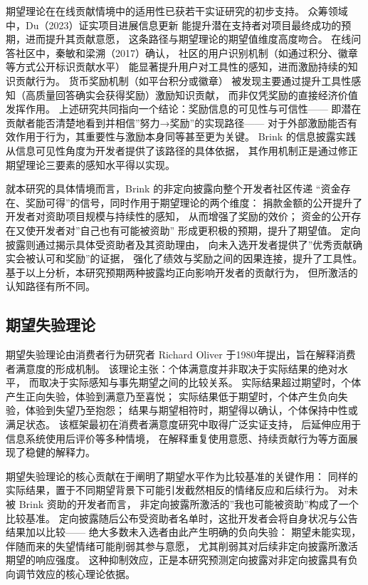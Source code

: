 期望理论在在线贡献情境中的适用性已获若干实证研究的初步支持。
众筹领域中，Du（2023）证实项目进展信息更新
能提升潜在支持者对项目最终成功的预期，进而提升其贡献意愿，
这条路径与期望理论的期望值维度高度吻合\cite{du2023impact}。
在线问答社区中，秦敏和梁溯（2017）确认，
社区的用户识别机制（如通过积分、徽章等方式公开标识贡献水平）
能显著提升用户对工具性的感知，进而激励持续的知识贡献行为\cite{qin2017user}。
货币奖励机制（如平台积分或徽章）
被发现主要通过提升工具性感知（高质量回答确实会获得奖励）激励知识贡献，
而非仅凭奖励的直接经济价值发挥作用。
上述研究共同指向一个结论：奖励信息的可见性与可信性——
即潜在贡献者能否清楚地看到并相信”努力→奖励”的实现路径——
对于外部激励能否有效作用于行为，其重要性与激励本身同等甚至更为关键。
Brink 的信息披露实践从信息可见性角度为开发者提供了该路径的具体依据，
其作用机制正是通过修正期望理论三要素的感知水平得以实现。

就本研究的具体情境而言，Brink 的非定向披露向整个开发者社区传递
“资金存在、奖励可得”的信号，同时作用于期望理论的两个维度：
捐款金额的公开提升了开发者对资助项目规模与持续性的感知，
从而增强了奖励的效价；
资金的公开存在又使开发者对”自己也有可能被资助”
形成更积极的预期，提升了期望值。
定向披露则通过揭示具体受资助者及其资助理由，
向未入选开发者提供了”优秀贡献确实会被认可和奖励”的证据，
强化了绩效与奖励之间的因果连接，提升了工具性。
基于以上分析，本研究预期两种披露均正向影响开发者的贡献行为，
但所激活的认知路径有所不同。

\subsection{期望失验理论}

期望失验理论由消费者行为研究者
Richard Oliver 于1980年提出，旨在解释消费者满意度的形成机制\cite{oliver1980cognitive}。
该理论主张：个体满意度并非取决于实际结果的绝对水平，
而取决于实际感知与事先期望之间的比较关系。
实际结果超过期望时，个体产生正向失验，体验到满意乃至喜悦；
实际结果低于期望时，个体产生负向失验，体验到失望乃至抱怨；
结果与期望相符时，期望得以确认，个体保持中性或满足状态。
该框架最初在消费者满意度研究中取得广泛实证支持，
后延伸应用于信息系统使用后评价\cite{abrate2021relationship}等多种情境，
在解释重复使用意愿、持续贡献行为等方面展现了稳健的解释力。

期望失验理论的核心贡献在于阐明了期望水平作为比较基准的关键作用：
同样的实际结果，置于不同期望背景下可能引发截然相反的情绪反应和后续行为。
对未被 Brink 资助的开发者而言，
非定向披露所激活的”我也可能被资助”构成了一个比较基准。
定向披露随后公布受资助者名单时，这批开发者会将自身状况与公告结果加以比较——
绝大多数未入选者由此产生明确的负向失验：
期望未能实现，伴随而来的失望情绪可能削弱其参与意愿，
尤其削弱其对后续非定向披露所激活期望的响应强度。
这种抑制效应，正是本研究预测定向披露对非定向披露具有负向调节效应的核心理论依据。

